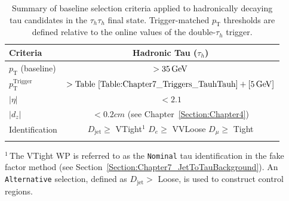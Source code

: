 {
\setlength{\arrayrulewidth}{1pt}

\begin{table}[!htbp]
\centering
\caption[Summary of baseline selection criteria for $\tau_h$ candidates in the $\tau_h\tau_h$ channel.]{
Summary of baseline selection criteria applied to hadronically decaying tau candidates in the $\tau_h\tau_h$ final state. Trigger-matched $p_\text{T}$ thresholds are defined relative to the online values of the double-$\tau_h$ trigger.}
\label{Table:Chapter7_TauhSelectionSummary}

\renewcommand{\arraystretch}{1.5}
\setlength{\tabcolsep}{12pt}

\begin{tabular}{lc}
\hline
Criteria & Hadronic Tau ($\tau_h$) \\
\hline
$p_\text{T}$ (baseline) &  $> 35 \,\text{Ge\hspace{-.08em}V}$\\
\arrayrulecolor{lightgray} \hline

$p_\text{T}^{\text{Trigger}}$ & $ > \text{Table~\ref{Table:Chapter7_Triggers_TauhTauh}} + [5\,\text{Ge\hspace{-.08em}V}]$ \\
\arrayrulecolor{lightgray} \hline

$|\eta|$ & $< 2.1$ \\
\arrayrulecolor{lightgray} \hline

$|d_z|$ & $< 0.2\unit{cm}$ (see Chapter~\ref{Section:Chapter4}) \\
\arrayrulecolor{lightgray} \hline

Identification 
& \makecell{
\normalfont\footnotesize$D_{\text{jet}} \geq$ VTight\hyperlink{Alternative-FFcut_CP}{$^1$} \\
\normalfont\footnotesize$D_{e} \geq$ VVLoose \\
\normalfont\footnotesize$D_{\mu} \geq$ Tight
} \\ 
\arrayrulecolor{black} \hline
\end{tabular}
\vspace{0.5em}
\begin{minipage}{0.95\linewidth}
\raggedright
\footnotesize
\hypertarget{Alternative-FFcut_CP}{}$^{1}$\,The VTight \ac{WP} is referred to as the \texttt{Nominal} tau identification in the fake factor method (see Section~\ref{Section:Chapter7_JetToTauBackground}). An \texttt{Alternative} selection, defined as $D_{\text{jet}} >$ Loose, is used to construct control regions.

\end{minipage}
\end{table}
}

